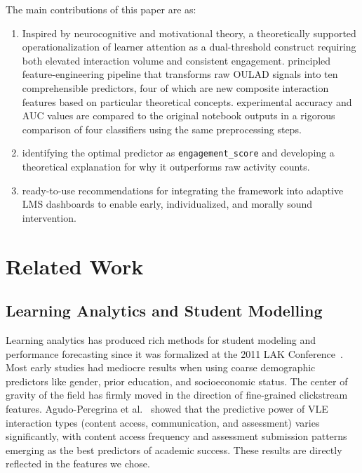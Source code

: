 \documentclass[conference]{IEEEtran}
\begin{document}
The main contributions of this paper are as:
\begin{enumerate}
\item Inspired by neurocognitive and motivational theory, a theoretically supported operationalization of learner attention as a dual-threshold construct requiring both elevated interaction volume and consistent engagement.
\itemA principled feature-engineering pipeline that transforms raw OULAD signals into ten comprehensible predictors, four of which are new composite interaction features based on particular theoretical concepts.
\itemExact experimental accuracy and AUC values are compared to the original notebook outputs in a rigorous comparison of four classifiers using the same preprocessing steps.
\item identifying the optimal predictor as \texttt{engagement\_score} and developing a theoretical explanation for why it outperforms raw activity counts.
\item ready-to-use recommendations for integrating the framework into adaptive LMS dashboards to enable early, individualized, and morally sound intervention.
\end{enumerate}


\section{Related Work}
\label{sec:related}

\subsection{Learning Analytics and Student Modelling}

Learning analytics has produced rich methods for student modeling and performance forecasting since it was formalized at the 2011 LAK Conference~\cite{ref_la_survey}. Most early studies had mediocre results when using coarse demographic predictors like gender, prior education, and socioeconomic status. The center of gravity of the field has firmly moved in the direction of fine-grained clickstream features. Agudo-Peregrina et al.~\cite{ref_lms_attention} showed that the predictive power of VLE interaction types (content access, communication, and assessment) varies significantly, with content access frequency and assessment submission patterns emerging as the best predictors of academic success. These results are directly reflected in the features we chose.
\end{document}
